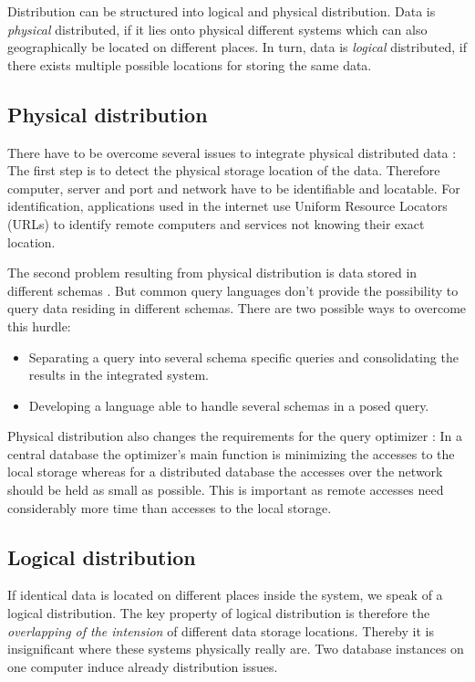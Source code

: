 Distribution can be structured into logical and physical distribution. Data is \textit{physical} distributed, if it lies onto physical different systems which can also geographically be located on different places. In turn, data is \textit{logical} distributed, if there exists multiple possible locations for storing the same data. 

\subsection{Physical distribution}
There have to be overcome several issues to integrate physical distributed data \cite[p. 51]{DBLP:books/dp/LeserN2006}: The first step is to detect the physical storage location of the data. Therefore computer, server and port and network have to be identifiable and locatable. For identification, applications used in the internet use Uniform Resource Locators (URLs) to identify remote computers and services not knowing their exact location.

The second problem resulting from physical distribution is data stored in different schemas \cite[p. 52]{DBLP:books/dp/LeserN2006}. But common query languages don't provide the possibility to query data residing in different schemas. There are two possible ways to overcome this hurdle:
\begin{itemize}
\item Separating a query into several schema specific queries and consolidating the results in the integrated system.
\item Developing a language able to handle several schemas in a posed query.
\end{itemize}

Physical distribution also changes the requirements for the query optimizer \cite[p. 52]{DBLP:books/dp/LeserN2006}: In a central database the optimizer's main function is minimizing  the accesses to the local storage whereas for a distributed database the accesses over the network should be held as small as possible. This is important as remote accesses need considerably more time than accesses to the local storage.  

\subsection{Logical distribution}
If identical data is located on different places inside the system, we speak of a logical distribution. The key property of logical distribution is therefore the \textit{overlapping of the intension} of different data storage locations. Thereby it is insignificant where these systems physically really are. Two database instances on one computer induce already distribution issues.

